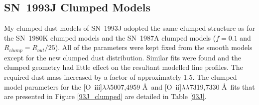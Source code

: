 \subsection{SN~1993J Clumped Models}

My clumped dust models of SN~1993J adopted the same clumped structure as for the SN~1980K clumped models and the SN~1987A clumped models ($f=0.1$ and $R_{clump}=R_{out}/25$).  All of the parameters were kept fixed from the smooth models except for the new clumped dust distribution.  Similar fits were found and the clumped geometry had little effect on the resultant modelled line profiles.   The required dust mass increased by a factor of approximately 1.5.  The clumped model parameters for the [O~{\sc iii}]$\lambda\lambda$5007,4959 \AA\ and [O~{\sc ii}]$\lambda\lambda$7319,7330 \AA\ fits that are presented in Figure \ref{93J_clumped} are detailed in Table \ref{93J}. 



